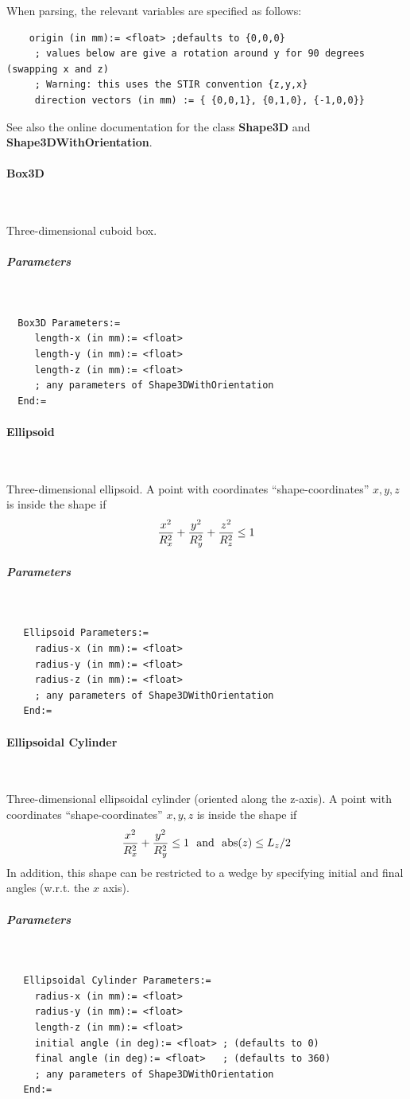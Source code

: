 \documentclass{article}
\newcommand{\subsubsubsection}[1]{\paragraph{#1}\mbox{} \\}
\newcommand{\subsubsubsubsection}[1]{\subparagraph{#1} \mbox{} \\}
\begin{document}
{{{{{{When parsing, the relevant variables are specified as follows:
\begin{verbatim}
    origin (in mm):= <float> ;defaults to {0,0,0}
     ; values below are give a rotation around y for 90 degrees (swapping x and z)
     ; Warning: this uses the STIR convention {z,y,x}
     direction vectors (in mm) := { {0,0,1}, {0,1,0}, {-1,0,0}}
\end{verbatim}

See also the online documentation for the class \textbf{Shape3D} and
\textbf{Shape3DWithOrientation}.

{ \subsubsubsection{Box3D}
}
Three-dimensional cuboid box.
{ \subsubsubsubsection{Parameters}
}
\begin{verbatim}
  Box3D Parameters:=
     length-x (in mm):= <float>
     length-y (in mm):= <float>
     length-z (in mm):= <float>
     ; any parameters of Shape3DWithOrientation
  End:=
\end{verbatim}

{ \subsubsubsection{Ellipsoid}
}
Three-dimensional ellipsoid.
A point with coordinates ``shape-coordinates'' $x,y,z$ is inside the shape if
\[
  {x^2 \over R_x^2} + {y^2 \over R_y^2} + {z^2 \over R_z^2} \le 1
\]
{ \subsubsubsubsection{Parameters}
}
\begin{verbatim}
   Ellipsoid Parameters:=
     radius-x (in mm):= <float>
     radius-y (in mm):= <float>
     radius-z (in mm):= <float>
     ; any parameters of Shape3DWithOrientation
   End:=
\end{verbatim}

{ \subsubsubsection{Ellipsoidal Cylinder}
}
Three-dimensional ellipsoidal cylinder (oriented along the z-axis).
A point with coordinates ``shape-coordinates'' $x,y,z$ is inside the shape if
\[
  {x^2 \over R_x^2} + {y^2 \over R_y^2}  \le 1 \,\,\,\, \mathrm{and}  \,\,\,\,\mathrm{abs}(z) \le L_z/2
\]
In addition, this shape can be restricted to a wedge by specifying initial and final angles (w.r.t. the $x$ axis).
\subsubsubsubsection{Parameters}
\begin{verbatim}
   Ellipsoidal Cylinder Parameters:=
     radius-x (in mm):= <float>
     radius-y (in mm):= <float>
     length-z (in mm):= <float>
     initial angle (in deg):= <float> ; (defaults to 0)
     final angle (in deg):= <float>   ; (defaults to 360)
     ; any parameters of Shape3DWithOrientation
   End:=
\end{verbatim}

}}}}}}
\end{document}
